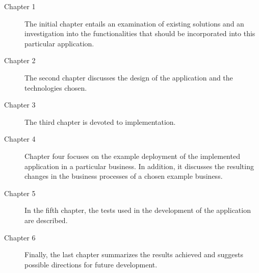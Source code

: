 \begin{description}
\item[Chapter 1] The initial chapter entails an examination of existing solutions and an investigation into the functionalities that should be incorporated into this particular application.

\item[Chapter 2] The second chapter discusses the design of the application and the technologies chosen.

\item[Chapter 3] The third chapter is devoted to implementation.

\item[Chapter 4] Chapter four focuses on the example deployment of the implemented application in a particular business. In addition, it discusses the resulting changes in the business processes of a chosen example business.

\item[Chapter 5] In the fifth chapter, the tests used in the development of the application are described.

\item[Chapter 6] Finally, the last chapter summarizes the results achieved and suggests possible directions for future development.
\end{description}